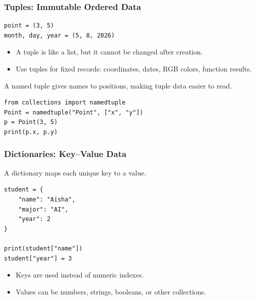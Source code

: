 \documentclass[aspectratio=169,10pt]{beamer}
\newenvironment{bluebox}[1]{%
  \vspace{0.08cm}\begin{tcolorbox}[lecturebox,title={#1},fontupper=\small]%
}{\end{tcolorbox}\vspace{0.05cm}}
\begin{document}
\begin{frame}[fragile]
\frametitle{Tuples: Immutable Ordered Data}
\begin{lstlisting}[style=py]
point = (3, 5)
month, day, year = (5, 8, 2026)
\end{lstlisting}
\begin{itemize}
  \item A tuple is like a list, but it cannot be changed after creation.
  \item Use tuples for fixed records: coordinates, dates, RGB colors, function results.
\end{itemize}
\begin{bluebox}{Named tuples}
A named tuple gives names to positions, making tuple data easier to read.
\end{bluebox}
\begin{lstlisting}[style=py]
from collections import namedtuple
Point = namedtuple("Point", ["x", "y"])
p = Point(3, 5)
print(p.x, p.y)
\end{lstlisting}
\end{frame}

\begin{frame}[fragile]
\frametitle{Dictionaries: Key--Value Data}
\begin{bluebox}{Key idea}
A dictionary maps each unique key to a value.
\end{bluebox}
\begin{lstlisting}[style=py]
student = {
    "name": "Aisha",
    "major": "AI",
    "year": 2
}

print(student["name"])
student["year"] = 3
\end{lstlisting}
\begin{itemize}
  \item Keys are used instead of numeric indexes.
  \item Values can be numbers, strings, booleans, or other collections.
\end{itemize}
\end{frame}
\end{document}

